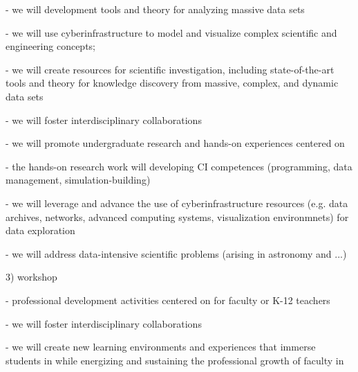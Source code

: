 {{- we will development tools and theory for analyzing massive data sets

- we will use cyberinfrastructure to model and visualize complex scientific and engineering 
   concepts;

- we will create resources for scientific investigation, including state-of-the-art tools and 
  theory for knowledge discovery from massive, complex, and dynamic data sets

- we will foster interdisciplinary collaborations

- we will promote undergraduate research and hands-on experiences centered on \cdse

- the hands-on research work will developing CI competences (programming, data 
   management, simulation-building)

- we will leverage and advance the use of cyberinfrastructure resources (e.g. data archives, 
   networks, advanced computing systems, visualization environmnets) for data exploration

- we will address data-intensive scientific problems (arising in astronomy and ...)

3) workshop

- professional development activities centered on \cdse for faculty or K-12 teachers

- we will foster interdisciplinary collaborations

- we will create new learning environments and experiences that immerse students in \cdse 
   while energizing and sustaining the professional growth of faculty in \cdse
}
}
